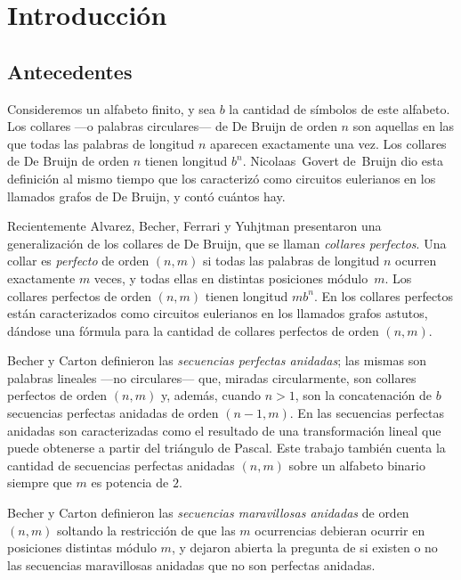 \chapter{Introducción}

\section{Antecedentes}

Consideremos un alfabeto finito, y sea $b$ la
cantidad de símbolos de este alfabeto.
Los collares ---o palabras circulares--- de
De Bruijn de orden $n$ son aquellas en las que todas las palabras de longitud
$n$ aparecen exactamente una vez.
Los collares de De Bruijn de orden $n$ tienen longitud $b^n$.
Nicolaas~Govert de~Bruijn \cite{de-bruijn-combinatorial-problem}
dio esta definición al mismo tiempo que los caracterizó como circuitos eulerianos
en los llamados grafos de De Bruijn, y contó cuántos hay.

Recientemente Alvarez, Becher, Ferrari y Yuhjtman \cite{alvarez-perfect-necklaces}
presentaron una generalización de los collares de De Bruijn,
que se llaman \emph{collares perfectos}.
Una collar es \emph{perfecto} de orden $(n,m)$ si todas las palabras 
de longitud $n$ ocurren exactamente $m$ veces, y todas ellas en distintas
posiciones módulo~$m$.
Los collares perfectos de orden $(n,m)$ tienen longitud $mb^n$.
En \cite{alvarez-perfect-necklaces} los collares perfectos están
caracterizados como circuitos eulerianos en los llamados grafos astutos,
dándose una fórmula para la cantidad de collares perfectos de orden $(n,m)$.

Becher y Carton \cite{becher-nested-perfect} definieron las
\emph{secuencias perfectas anidadas}; las mismas son palabras lineales ---no
circulares--- que, miradas circularmente, son collares perfectos de orden $(n,m)$
y, además, cuando $n>1$, son la concatenación de $b$ secuencias perfectas
anidadas de orden $(n-1, m)$.
En \cite{becher-nested-perfect} las secuencias perfectas anidadas son
caracterizadas como el resultado de una transformación lineal que puede
obtenerse a partir del triángulo de Pascal. Este trabajo también cuenta la
cantidad de secuencias perfectas anidadas $(n,m)$ sobre un alfabeto binario
siempre que $m$ es potencia de $2$.

Becher y Carton definieron las \emph{secuencias maravillosas anidadas}
de orden $(n,m)$ soltando la restricción de que las $m$ ocurrencias debieran
ocurrir en posiciones distintas módulo $m$, y dejaron abierta la pregunta de si
existen o no las secuencias maravillosas anidadas que no son perfectas anidadas.

